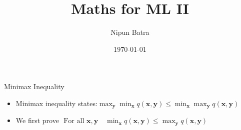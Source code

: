 \documentclass[xcolor=table]{beamer}
\title{Maths for ML II}
\date{\today}
\author{Nipun Batra}
\institute{IIT Gandhinagar}
\begin{document}
  \maketitle
  
  
  
\begin{frame}{Minimax Inequality}

    \begin{itemize}[<+->]
       \item Minimax inequality states:$\max _{\boldsymbol{y}} \min _{\boldsymbol{x}} q(\boldsymbol{x}, \boldsymbol{y}) \leqslant \min _{\boldsymbol{x}} \max _{\boldsymbol{y}} q(\boldsymbol{x}, \boldsymbol{y})$
        \item We first prove $\text { For all } \boldsymbol{x}, \boldsymbol{y} \quad \min _{\boldsymbol{x}} q(\boldsymbol{x}, \boldsymbol{y}) \leqslant \max _{\boldsymbol{y}} q(\boldsymbol{x}, \boldsymbol{y})$
    \end{itemize}
\end{frame}
\end{document}
